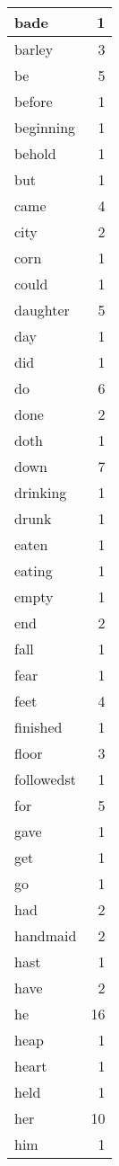 \begin{center}
\begin{longtable}{l|r}
bade & 1 \\ \hline
barley & 3 \\ \hline
be & 5 \\ \hline
before & 1 \\ \hline
beginning & 1 \\ \hline
behold & 1 \\ \hline
but & 1 \\ \hline
came & 4 \\ \hline
city & 2 \\ \hline
corn & 1 \\ \hline
could & 1 \\ \hline
daughter & 5 \\ \hline
day & 1 \\ \hline
did & 1 \\ \hline
do & 6 \\ \hline
done & 2 \\ \hline
doth & 1 \\ \hline
down & 7 \\ \hline
drinking & 1 \\ \hline
drunk & 1 \\ \hline
eaten & 1 \\ \hline
eating & 1 \\ \hline
empty & 1 \\ \hline
end & 2 \\ \hline
fall & 1 \\ \hline
fear & 1 \\ \hline
feet & 4 \\ \hline
finished & 1 \\ \hline
floor & 3 \\ \hline
followedst & 1 \\ \hline
for & 5 \\ \hline
gave & 1 \\ \hline
get & 1 \\ \hline
go & 1 \\ \hline
had & 2 \\ \hline
handmaid & 2 \\ \hline
hast & 1 \\ \hline
have & 2 \\ \hline
he & 16 \\ \hline
heap & 1 \\ \hline
heart & 1 \\ \hline
held & 1 \\ \hline
her & 10 \\ \hline
him & 1 \\ \hline

\end{longtable}
\end{center}
